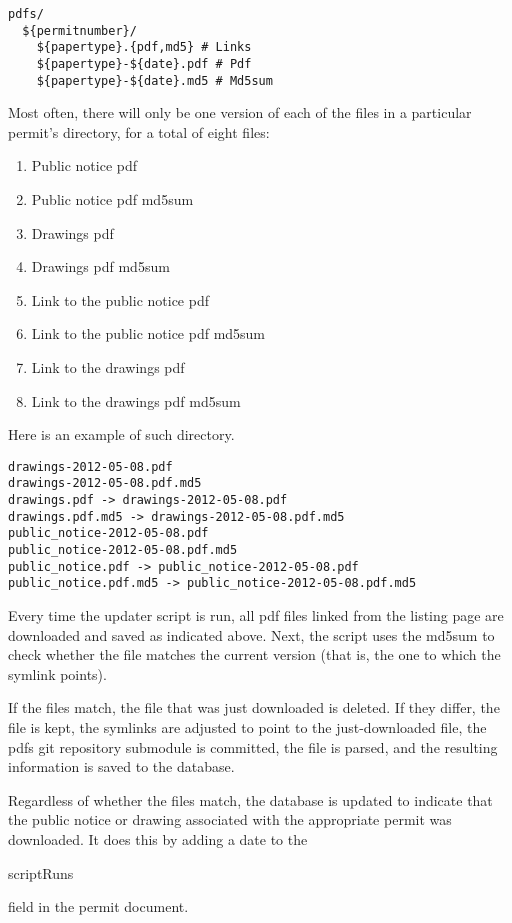 \documentclass{article}
\begin{document}
\begin{verbatim}
pdfs/
  ${permitnumber}/
    ${papertype}.{pdf,md5} # Links
    ${papertype}-${date}.pdf # Pdf
    ${papertype}-${date}.md5 # Md5sum
\end{verbatim}

Most often, there will only be one version of each of the files in a
particular permit's directory, for a total of eight files:
\begin{enumerate}
\item Public notice pdf
\item Public notice pdf md5sum
\item Drawings pdf
\item Drawings pdf md5sum
\item Link to the public notice pdf
\item Link to the public notice pdf md5sum
\item Link to the drawings pdf
\item Link to the drawings pdf md5sum
\end{enumerate}

Here is an example of such directory.

\begin{verbatim}
drawings-2012-05-08.pdf
drawings-2012-05-08.pdf.md5
drawings.pdf -> drawings-2012-05-08.pdf
drawings.pdf.md5 -> drawings-2012-05-08.pdf.md5
public_notice-2012-05-08.pdf
public_notice-2012-05-08.pdf.md5
public_notice.pdf -> public_notice-2012-05-08.pdf
public_notice.pdf.md5 -> public_notice-2012-05-08.pdf.md5
\end{verbatim}

Every time the updater script is run, all pdf files linked from the listing
page are downloaded and saved as indicated above. Next, the script uses the
md5sum to check whether the file matches the current version (that is, the
one to which the symlink points).

If the files match, the file that was just downloaded is deleted. If they
differ, the file is kept, the symlinks are adjusted to point to the
just-downloaded file, the pdfs git repository submodule is committed,
the file is parsed, and the resulting information is saved to the database.

Regardless of whether the files match, the database is updated to indicate
that the public notice or drawing associated with the appropriate permit
was downloaded. It does this by adding a date to the
\begin{texttt}scriptRuns\end{texttt} field in the permit document.
\end{document}
